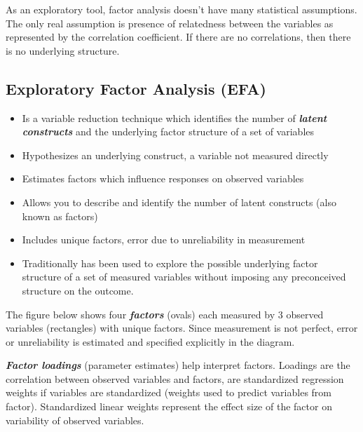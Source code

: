 \documentclass[a4paper,12pt]{article}
\begin{document}
As an exploratory tool, factor analysis doesn't have many statistical
assumptions. The only real assumption is presence of relatedness
between the variables as represented by the correlation coefficient. If
there are no correlations, then there is no underlying structure.

\subsection{Exploratory Factor Analysis (EFA)}
\begin{itemize}
\item Is a variable reduction technique which identifies the number of \textbf{\emph{latent constructs}} and the underlying factor
structure of a set of variables
\item Hypothesizes an underlying construct, a variable not measured directly
\item Estimates factors which influence responses on observed variables
\item Allows you to describe and identify the number of latent constructs (also known as factors)
\item Includes unique factors, error due to unreliability in measurement
\item Traditionally has been used to explore the possible underlying factor structure of a set of measured variables without imposing any preconceived structure on the outcome.
\end{itemize}

The figure below shows four \textbf{\emph{factors}} (ovals) each measured by 3 observed variables (rectangles) with unique factors. Since measurement is not perfect, error or unreliability is estimated and specified explicitly in the diagram.

\textbf{\emph{Factor loadings}} (parameter estimates) help interpret factors. Loadings are the correlation between observed variables and factors, are standardized regression weights if variables are standardized (weights used to predict variables from factor). Standardized linear weights represent the effect size of the factor
on variability of observed variables.
\end{document}
